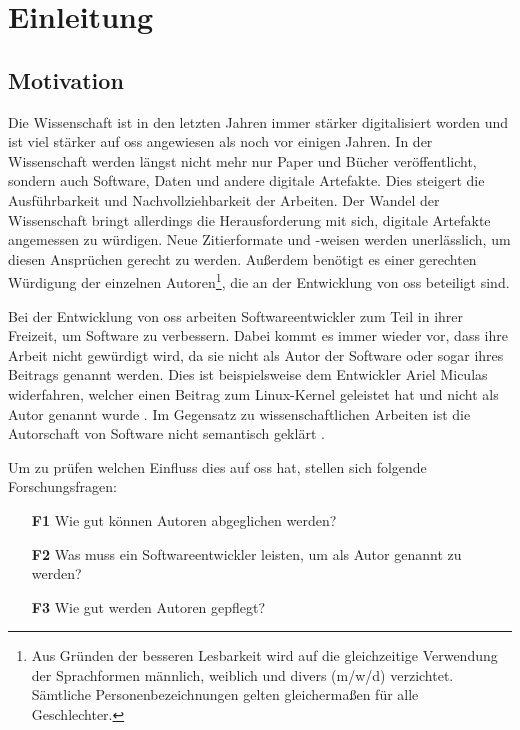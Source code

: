 \chapter{Einleitung}
\label{chap:einleitung}
\section{Motivation}
\label{sec:motivation}
Die Wissenschaft ist in den letzten Jahren immer stärker digitalisiert worden und ist viel stärker auf \gls{oss} angewiesen als noch vor einigen Jahren.
In der Wissenschaft werden längst nicht mehr nur Paper und Bücher veröffentlicht, sondern auch Software, Daten und andere digitale Artefakte.
Dies steigert die Ausführbarkeit und Nachvollziehbarkeit der Arbeiten.
Der Wandel der Wissenschaft bringt allerdings die Herausforderung mit sich, digitale Artefakte angemessen zu würdigen.
Neue Zitierformate und -weisen werden unerlässlich, um diesen Ansprüchen gerecht zu werden.
Außerdem benötigt es einer gerechten Würdigung der einzelnen Autoren\footnote{Aus Gründen der besseren Lesbarkeit wird auf die gleichzeitige Verwendung der Sprachformen männlich, weiblich und divers (m/w/d) verzichtet. Sämtliche Personenbezeichnungen gelten gleichermaßen für alle Geschlechter.}, die an der Entwicklung von \gls{oss} beteiligt sind.

Bei der Entwicklung von \gls{oss} arbeiten Softwareentwickler zum Teil in ihrer Freizeit, um Software zu verbessern.
Dabei kommt es immer wieder vor, dass ihre Arbeit nicht gewürdigt wird, da sie nicht als Autor der Software oder sogar ihres Beitrags genannt werden.
Dies ist beispielsweise dem Entwickler Ariel Miculas widerfahren, welcher einen Beitrag zum Linux-Kernel geleistet hat und nicht als Autor genannt wurde \autocite{miculas_how_2023}.
Im Gegensatz zu wissenschaftlichen Arbeiten ist die Autorschaft von Software nicht semantisch geklärt \autocite{schmidt_software_nodate}.

Um zu prüfen welchen Einfluss dies auf \gls{oss} hat, stellen sich folgende Forschungsfragen:

\begin{itemize}
    \item[\textbf{F1}] Wie gut können Autoren abgeglichen werden?
    \item[\textbf{F2}] Was muss ein Softwareentwickler leisten, um als Autor genannt zu werden?
    \item[\textbf{F3}] Wie gut werden Autoren gepflegt?
\end{itemize}

